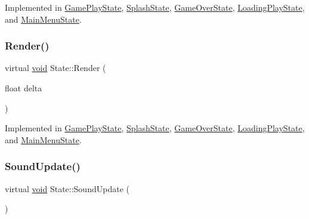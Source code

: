 Implemented in \hyperlink{classGamePlayState_a3bc9231fd11546b5dd13581ed2aa1afa}{Game\+Play\+State}, \hyperlink{classSplashState_adb2eb87bd89e41af0c3a9d0903e89450}{Splash\+State}, \hyperlink{classGameOverState_adb4be2a5c6292d020999c2da9588ebfc}{Game\+Over\+State}, \hyperlink{classLoadingPlayState_a69ec7d3e42aa57e4db484e201aae3c63}{Loading\+Play\+State}, and \hyperlink{classMainMenuState_aa62c91d35b5b4a24c0a13c22020845e8}{Main\+Menu\+State}.

\mbox{\label{classState_a0e48dfae1e3090630475812681417c5f}} 
\subsubsection{\texorpdfstring{Render()}{Render()}}
{\footnotesize\ttfamily virtual \hyperlink{imgui__impl__opengl3__loader_8h_ac668e7cffd9e2e9cfee428b9b2f34fa7}{void} State\+::\+Render (\begin{DoxyParamCaption}\item[{float}]{delta }\end{DoxyParamCaption})\hspace{0.3cm}{\ttfamily [pure virtual]}}



Implemented in \hyperlink{classGamePlayState_a4bd296aa04088a3d8249f569e86f21a7}{Game\+Play\+State}, \hyperlink{classSplashState_a5efb6f0ede61ec76ee2dd72a6b24c57c}{Splash\+State}, \hyperlink{classGameOverState_ac9c9ef71b0a12940ac5caa7763f23fdc}{Game\+Over\+State}, \hyperlink{classLoadingPlayState_a9f52c378fd76e40eb366d6da2c57ab11}{Loading\+Play\+State}, and \hyperlink{classMainMenuState_af675ec319923f1cf22446808a7735dea}{Main\+Menu\+State}.

\mbox{\label{classState_a6572089fbf2178bf5c582cc27d6d3925}} 
\subsubsection{\texorpdfstring{Sound\+Update()}{SoundUpdate()}}
{\footnotesize\ttfamily virtual \hyperlink{imgui__impl__opengl3__loader_8h_ac668e7cffd9e2e9cfee428b9b2f34fa7}{void} State\+::\+Sound\+Update (\begin{DoxyParamCaption}{ }\end{DoxyParamCaption})\hspace{0.3cm}{\ttfamily [pure virtual]}}



